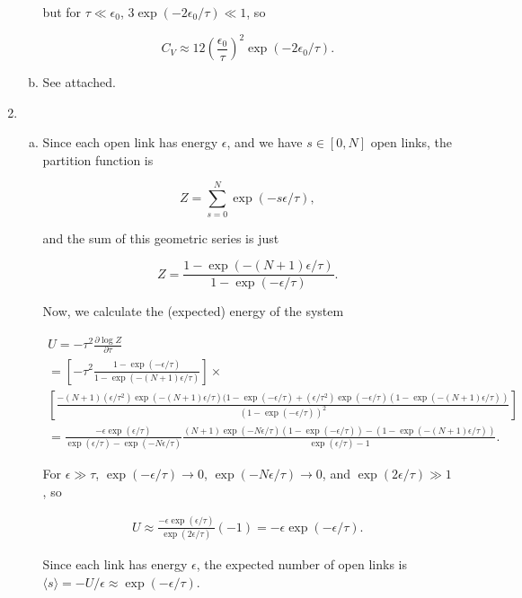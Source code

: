 \documentclass{article}
\begin{document}
\begin{enumerate}
\begin{enumerate}[(a)]
		but for $\tau \ll \epsilon_0$, $3\exp(-2\epsilon_0/\tau) \ll 1$, so

		$$C_V \approx 12 \left( \frac{\epsilon_0}{\tau} \right)^2 \exp(-2\epsilon_0/\tau).$$

		\item

		See attached.

	\end{enumerate}

	\item 

	\begin{enumerate}[(a)]

		\item

		Since each open link has energy $\epsilon$, and we have $s \in [0, N]$ open links, the partition function is

		$$Z = \sum \limits_{s=0}^{N} \exp(-s\epsilon/\tau),$$

		and the sum of this geometric series is just

		$$Z = \frac{1 - \exp(-(N+1)\epsilon/\tau)}{1 - \exp(-\epsilon/\tau)}.$$

		Now, we calculate the (expected) energy of the system

		\begin{gather*}
		U = -\tau^2 \frac{\partial \log Z}{\partial \tau} \\
		= \left[ -\tau^2 \frac{1 - \exp(-\epsilon/\tau)}{1 - \exp(-(N+1)\epsilon/\tau)} \right] \times \\ \left[ \frac{-(N+1)(\epsilon/\tau^2) \exp(-(N+1)\epsilon/\tau)(1-\exp(-\epsilon/\tau) + (\epsilon/\tau^2)\exp(-\epsilon/\tau)(1 - \exp(-(N+1)\epsilon/\tau)) }{(1 - \exp(-\epsilon/\tau))^2} \right] \\
		= \frac{-\epsilon  \exp(\epsilon/\tau)}{\exp(\epsilon/\tau) - \exp(-N\epsilon/\tau)} \frac{(N+1)\exp(-N\epsilon/\tau)(1 - \exp(-\epsilon/\tau)) - (1 - \exp(-(N+1)\epsilon/\tau))}{\exp(\epsilon/\tau) - 1}.
		\end{gather*}

		For $\epsilon \gg \tau$, $\exp(-\epsilon/\tau) \to 0$, $\exp(-N\epsilon/\tau) \to 0$, and $\exp(2\epsilon / \tau) \gg 1$, so

		\begin{gather*}
		U \approx \frac{-\epsilon \exp(\epsilon/\tau)}{\exp(2\epsilon / \tau)}(-1) = - \epsilon \exp(-\epsilon / \tau).
		\end{gather*}

		Since each link has energy $\epsilon$, the expected number of open links is $\langle s \rangle = -U/\epsilon \approx \exp(-\epsilon/\tau)$.


\end{enumerate}
\end{enumerate}
\end{document}
